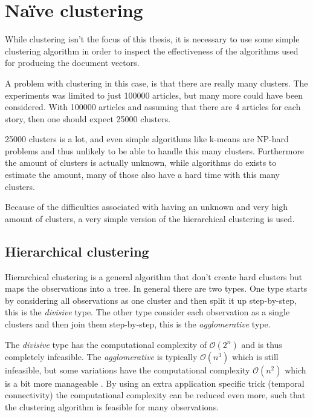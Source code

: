 \section{Naïve clustering}

While clustering isn't the focus of this thesis, it is necessary to use some simple clustering algorithm in order to inspect the effectiveness of the algorithms used for producing the document vectors.

A problem with clustering in this case, is that there are really many clusters. The experiments was limited to just 100000 articles, but many more could have been considered. With 100000 articles and assuming that there are 4 articles for each story, then one should expect 25000 clusters.

25000 clusters is a lot, and even simple algorithms like k-means are NP-hard problems and thus unlikely to be able to handle this many clusters. Furthermore the amount of clusters is actually unknown, while algorithms do exists to estimate the amount, many of those also have a hard time with this many clusters.

Because of the difficulties associated with having an unknown and very high amount of clusters, a very simple version of the hierarchical clustering is used.

\subsection{Hierarchical clustering}

Hierarchical clustering is a general algorithm that don't create hard clusters but maps the observations into a tree. In general there are two types. One type starts by considering all observations as one cluster and then split it up step-by-step, this is the \textit{divisive} type. The other type consider each observation as a single clusters and then join them step-by-step, this is the \textit{agglomerative} type.

The \textit{divisive} type has the computational complexity of $\mathcal{O}(2^n)$ and is thus completely infeasible. The \textit{agglomerative} is typically $\mathcal{O}(n^3)$ which is still infeasible, but some variations have the computational complexity $\mathcal{O}(n^2)$ which is a bit more manageable \cite{wiki-hcluster}. By using an extra application specific trick (temporal connectivity) the computational complexity can be reduced even more, such that the clustering algorithm is feasible for many observations.

